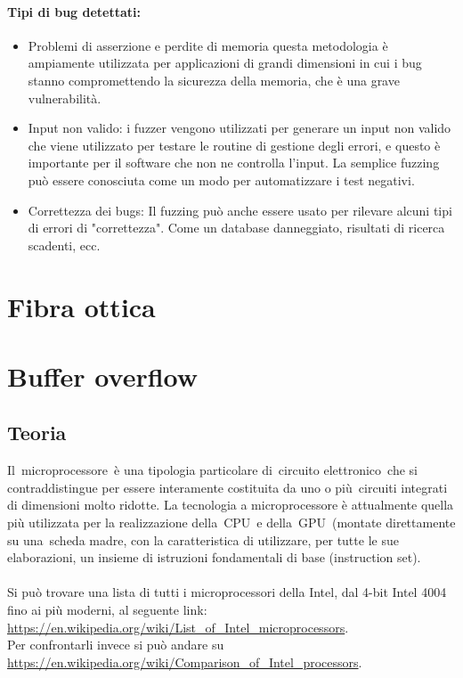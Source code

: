 \documentclass{article}
\begin{document}
\paragraph{Tipi di bug detettati:}
\begin{itemize}
    \item Problemi di asserzione e perdite di memoria questa metodologia è ampiamente utilizzata per 
    applicazioni di grandi dimensioni in cui i bug stanno compromettendo la sicurezza della memoria, 
    che è una grave vulnerabilità.
    \item Input non valido: i fuzzer vengono utilizzati per generare un input non valido che viene 
    utilizzato per testare le routine di gestione degli errori, e questo è importante per il software 
    che non ne controlla l'input. La semplice fuzzing può essere conosciuta come un modo per 
    automatizzare i test negativi.
    \item Correttezza dei bugs: Il fuzzing può anche essere usato per rilevare alcuni tipi di errori 
    di "correttezza". Come un database danneggiato, risultati di ricerca scadenti, ecc.
\end{itemize}
\section{Fibra ottica}

\section{Buffer overflow}
\subsection{Teoria}
Il microprocessore è una tipologia particolare di circuito elettronico che si contraddistingue per 
essere interamente costituita da uno o più circuiti integrati di dimensioni molto ridotte. 
La tecnologia a microprocessore è attualmente quella più utilizzata per la realizzazione della CPU e 
della GPU (montate direttamente su una scheda madre, con la caratteristica di utilizzare, per tutte 
le sue elaborazioni, un insieme di istruzioni fondamentali di base (instruction set).\\\\
Si può trovare una lista di tutti i microprocessori della Intel, dal 4-bit Intel 4004 fino ai più 
moderni, al seguente link: \url{https://en.wikipedia.org/wiki/List_of_Intel_microprocessors}. \\
Per confrontarli invece si può andare su \url{https://en.wikipedia.org/wiki/Comparison_of_Intel_processors}.
\end{document}
